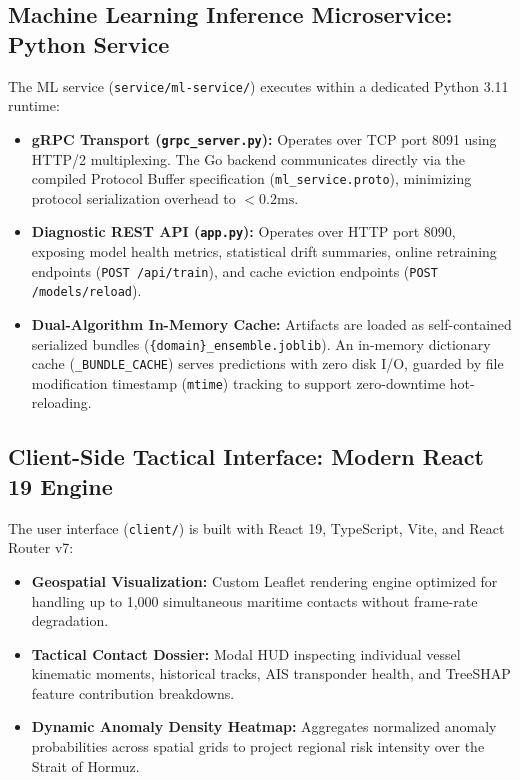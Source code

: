 \subsection{Machine Learning Inference Microservice: Python Service}
The ML service (\texttt{service/ml-service/}) executes within a dedicated Python 3.11 runtime:
\begin{itemize}[leftmargin=*]
    \item \textbf{gRPC Transport (\texttt{grpc\_server.py}):} Operates over TCP port 8091 using HTTP/2 multiplexing. The Go backend communicates directly via the compiled Protocol Buffer specification (\texttt{ml\_service.proto}), minimizing protocol serialization overhead to $<0.2\text{ms}$.
    \item \textbf{Diagnostic REST API (\texttt{app.py}):} Operates over HTTP port 8090, exposing model health metrics, statistical drift summaries, online retraining endpoints (\texttt{POST /api/train}), and cache eviction endpoints (\texttt{POST /models/reload}).
    \item \textbf{Dual-Algorithm In-Memory Cache:} Artifacts are loaded as self-contained serialized bundles (\texttt{\{domain\}\_ensemble.joblib}). An in-memory dictionary cache (\texttt{\_BUNDLE\_CACHE}) serves predictions with zero disk I/O, guarded by file modification timestamp (\texttt{mtime}) tracking to support zero-downtime hot-reloading.
\end{itemize}

\subsection{Client-Side Tactical Interface: Modern React 19 Engine}
The user interface (\texttt{client/}) is built with React 19, TypeScript, Vite, and React Router v7:
\begin{itemize}[leftmargin=*]
    \item \textbf{Geospatial Visualization:} Custom Leaflet rendering engine optimized for handling up to 1,000 simultaneous maritime contacts without frame-rate degradation.
    \item \textbf{Tactical Contact Dossier:} Modal HUD inspecting individual vessel kinematic moments, historical tracks, AIS transponder health, and TreeSHAP feature contribution breakdowns.
    \item \textbf{Dynamic Anomaly Density Heatmap:} Aggregates normalized anomaly probabilities across spatial grids to project regional risk intensity over the Strait of Hormuz.
\end{itemize}

